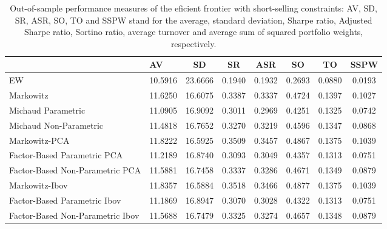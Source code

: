 \begin{table}

\caption{\label{tab:empirical_ef_2}Out-of-sample performance measures of the eficient frontier with short-selling constraints: AV, SD, SR, ASR, SO, TO and SSPW stand for the average, standard deviation, Sharpe ratio, Adjusted Sharpe ratio, Sortino ratio, average turnover and average sum of squared portfolio weights, respectively.}
\centering
\begin{tabular}[t]{l|l|c|c|c|c|c|c}
\hline
  & AV & SD & SR & ASR & SO & TO & SSPW\\
\hline
EW & 10.5916 & 23.6666 & 0.1940 & 0.1932 & 0.2693 & 0.0880 & 0.0193\\
\hline
Markowitz & 11.6250 & 16.6075 & 0.3387 & 0.3337 & 0.4724 & 0.1397 & 0.1027\\
\hline
Michaud Parametric & 11.0905 & 16.9092 & 0.3011 & 0.2969 & 0.4251 & 0.1325 & 0.0742\\
\hline
Michaud Non-Parametric & 11.4818 & 16.7652 & 0.3270 & 0.3219 & 0.4596 & 0.1347 & 0.0868\\
\hline
Markowitz-PCA & 11.8222 & 16.5925 & 0.3509 & 0.3457 & 0.4867 & 0.1375 & 0.1039\\
\hline
Factor-Based Parametric PCA & 11.2189 & 16.8740 & 0.3093 & 0.3049 & 0.4357 & 0.1313 & 0.0751\\
\hline
Factor-Based Non-Parametric PCA & 11.5881 & 16.7458 & 0.3337 & 0.3286 & 0.4671 & 0.1349 & 0.0879\\
\hline
Markowitz-Ibov & 11.8357 & 16.5884 & 0.3518 & 0.3466 & 0.4877 & 0.1375 & 0.1039\\
\hline
Factor-Based Parametric Ibov & 11.1869 & 16.8947 & 0.3070 & 0.3028 & 0.4322 & 0.1313 & 0.0751\\
\hline
Factor-Based Non-Parametric Ibov & 11.5688 & 16.7479 & 0.3325 & 0.3274 & 0.4657 & 0.1348 & 0.0879\\
\hline
\end{tabular}
\end{table}
